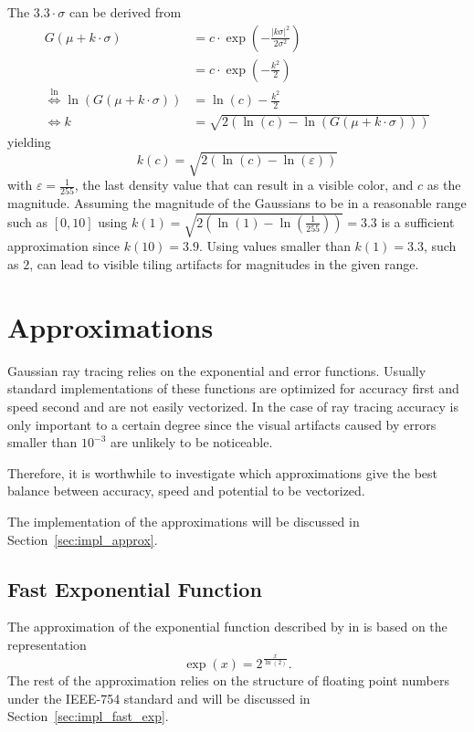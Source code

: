 \documentclass[a4paper, 11pt]{memoir}
\begin{document}
    The $3.3 \cdot \sigma$ can be derived from
    \begin{align}
        G(\mu + k \cdot \sigma) &= c \cdot \exp{\left(-\frac{|k \sigma|^2}{2\sigma^2}\right)}\\
        &= c \cdot \exp{\left(-\frac{k^2}{2}\right)}\\
        \overset{\ln}{\iff} \ln{\left( G(\mu + k\cdot\sigma) \right)} &= \ln{(c)} - \frac{k^2}{2}\\
        \iff k &= \sqrt{2\left(\ln{(c)} - \ln{\left( G(\mu + k\cdot\sigma) \right)}\right)}
    \end{align}
    yielding
    \begin{equation}
        k(c) = \sqrt{2(\ln{(c)} - \ln{(\varepsilon)})}
        \label{eq:sig_lim}
    \end{equation}
    with $\varepsilon = \frac{1}{255}$, the last density value that can result in a visible color, and $c$ as the
    magnitude. Assuming the magnitude of the Gaussians to be in a reasonable range such as $[0, 10]$ using $k(1) =
    \sqrt{2(\ln{(1)} - \ln{(\frac{1}{255})})} = 3.3$ is a sufficient approximation since $k(10) = 3.9$. Using values
    smaller than $k(1) = 3.3$, such as $2$, can lead to visible tiling artifacts for magnitudes in the given range.

    \chapter{Approximations}
    \label{ch:approximations}
    Gaussian ray tracing relies on the exponential and error functions. Usually standard implementations of these
    functions are optimized for accuracy first and speed second and are not easily vectorized. In the case of ray
    tracing accuracy is only important to a certain degree since the visual artifacts caused by errors smaller than
    $10^{-3}$ are unlikely to be noticeable.

    Therefore, it is worthwhile to investigate which approximations give the best balance between accuracy, speed and
    potential to be vectorized.

    The implementation of the approximations will be discussed in Section~\ref{sec:impl_approx}.

    \section{Fast Exponential Function}
    \label{sec:fast_exp}
    The approximation of the exponential function described by \citeauthor{fast_exp} in 
    \cite{fast_exp} is based on the representation
    \begin{equation}
        \exp{(x)} = 2^{\frac{x}{\ln{(2)}}}.
        \label{eq:exp_ident}
    \end{equation}
    The rest of the approximation relies on the structure of floating point numbers under the IEEE-754 standard and
    will be discussed in Section~\ref{sec:impl_fast_exp}.
    
\end{document}
